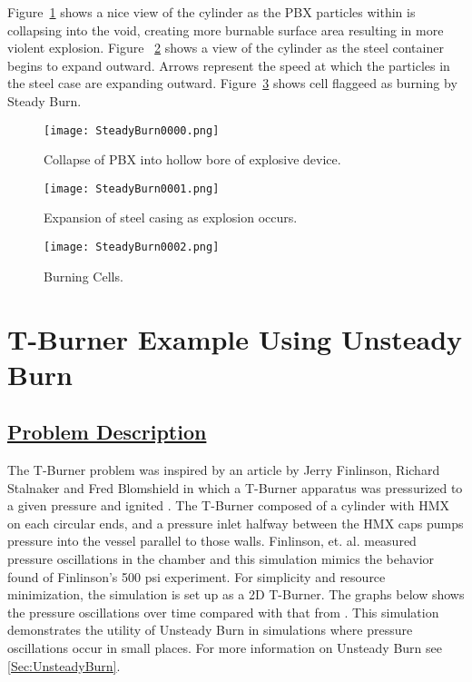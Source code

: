 Figure~\ref{figsteadyburn1} shows a nice view of the cylinder as the PBX particles within is collapsing into the void, creating  more burnable surface area resulting in more violent explosion.  Figure ~\ref{figsteadyburn2} shows a view of the cylinder as the steel container begins to expand outward.  Arrows represent the speed at which the particles in the steel case are expanding outward.  Figure~\ref{figsteadyburn3} shows cell flaggeed as burning by Steady Burn.

\begin{figure}
  \center
  \texttt{[image: SteadyBurn0000.png]}

  \caption{Collapse of PBX into hollow bore of explosive device.}
  \label{figsteadyburn1}
\end{figure}

\begin{figure}
  \center
  \texttt{[image: SteadyBurn0001.png]}

  \caption{Expansion of steel casing as explosion occurs.}
  \label{figsteadyburn2}
\end{figure}

\begin{figure}
  \center
  \texttt{[image: SteadyBurn0002.png]}

  \caption{Burning Cells.}
  \label{figsteadyburn3}
\end{figure}

\newpage
%
\newpage
\section*{\center  T-Burner Example Using Unsteady Burn}
\subsection*{\underline{Problem Description}}
The T-Burner problem was inspired by  an article by Jerry Finlinson, Richard Stalnaker and Fred Blomshield in which a T-Burner apparatus was pressurized to a given pressure and ignited \cite{ref:finlinson1}.  The T-Burner composed of a cylinder with HMX on each circular ends, and a pressure inlet halfway between the HMX caps pumps pressure into the vessel parallel to those walls.  Finlinson, et. al. measured pressure oscillations in the chamber and this simulation mimics the behavior found of Finlinson's 500 psi experiment.  For simplicity and resource minimization, the simulation is set up as a 2D T-Burner.  The graphs below shows the pressure oscillations over time compared with that from \cite{ref:finlinson1}.  This simulation demonstrates the utility of Unsteady Burn in simulations where pressure oscillations occur in small places.  For more information on Unsteady Burn see \ref{Sec:UnsteadyBurn}.

